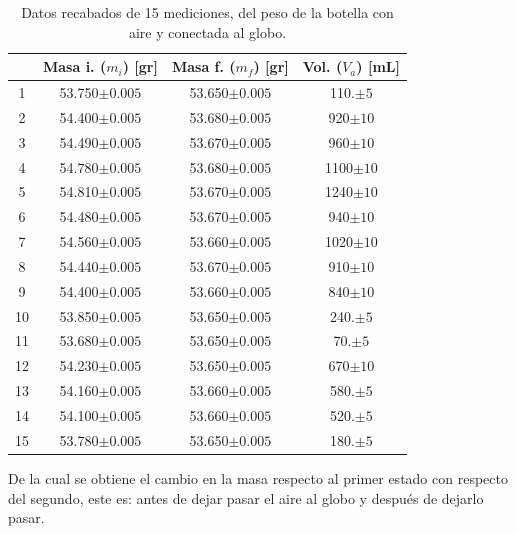 \documentclass[a4paper]{article}
\begin{document}
\begin{table}[H]
  \centering
    \begin{tabular}{|c|c|c|c|} \hline
     & Masa i. ($m_i$) [gr] & Masa f. ($m_f$) [gr] & Vol. ($V_a$) [mL] \\ \hline
    1     & 53.750$\pm0.005$ & 53.650$\pm0.005$ & 110.$\pm5$ \\ \hline
    2     & 54.400$\pm0.005$ & 53.680$\pm0.005$ & 920$\pm10$ \\ \hline
    3     & 54.490$\pm0.005$ & 53.670$\pm0.005$ & 960$\pm10$ \\ \hline
    4     & 54.780$\pm0.005$ & 53.680$\pm0.005$ & 1100$\pm10$\\ \hline
    5     & 54.810$\pm0.005$ & 53.670$\pm0.005$ & 1240$\pm10$\\ \hline
    6     & 54.480$\pm0.005$ & 53.670$\pm0.005$ & 940$\pm10$ \\ \hline
    7     & 54.560$\pm0.005$ & 53.660$\pm0.005$ & 1020$\pm10$\\ \hline
    8     & 54.440$\pm0.005$ & 53.670$\pm0.005$ & 910$\pm10$ \\ \hline
    9     & 54.400$\pm0.005$ & 53.660$\pm0.005$ & 840$\pm10$ \\ \hline
    10    & 53.850$\pm0.005$ & 53.650$\pm0.005$ & 240.$\pm5$ \\ \hline
    11    & 53.680$\pm0.005$ & 53.650$\pm0.005$ & 70.$\pm5$ \\ \hline
    12    & 54.230$\pm0.005$ & 53.650$\pm0.005$ & 670$\pm10$ \\ \hline
    13    & 54.160$\pm0.005$ & 53.660$\pm0.005$ & 580.$\pm5$ \\ \hline
    14    & 54.100$\pm0.005$ & 53.660$\pm0.005$ & 520.$\pm5$ \\ \hline
    15    & 53.780$\pm0.005$ & 53.650$\pm0.005$ & 180.$\pm5$ \\ \hline
    \end{tabular}%
      \caption{Datos recabados de 15 mediciones, del peso de la botella con aire y conectada al globo.}
\end{table}%

De la cual se obtiene el cambio en la masa respecto al primer estado con respecto del segundo, este es: antes de dejar pasar el aire al globo y después de dejarlo pasar.
\end{document}
